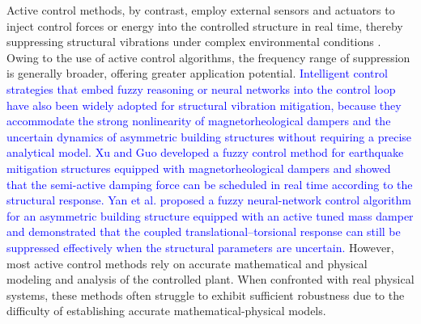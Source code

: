 \documentclass[review]{elsarticle}
\begin{document}
Active control methods, by contrast, employ external sensors and actuators to inject control forces or energy into the controlled structure in real time, thereby suppressing structural vibrations under complex environmental conditions \citep{xiao_model_2026}.
Owing to the use of active control algorithms, the frequency range of suppression is generally broader, offering greater application potential.
\textcolor{blue}{Intelligent control strategies that embed fuzzy reasoning or neural networks into the control loop have also been widely adopted for structural vibration mitigation, because they accommodate the strong nonlinearity of magnetorheological dampers and the uncertain dynamics of asymmetric building structures without requiring a precise analytical model. Xu and Guo \citep{xu_fuzzy_2006} developed a fuzzy control method for earthquake mitigation structures equipped with magnetorheological dampers and showed that the semi-active damping force can be scheduled in real time according to the structural response. Yan et al. \citep{yan_fuzzy_2020} proposed a fuzzy neural-network control algorithm for an asymmetric building structure equipped with an active tuned mass damper and demonstrated that the coupled translational--torsional response can still be suppressed effectively when the structural parameters are uncertain.}
However, most active control methods rely on accurate mathematical and physical modeling and analysis of the controlled plant.
When confronted with real physical systems, these methods often struggle to exhibit sufficient robustness due to the difficulty of establishing accurate mathematical-physical models.
\end{document}
